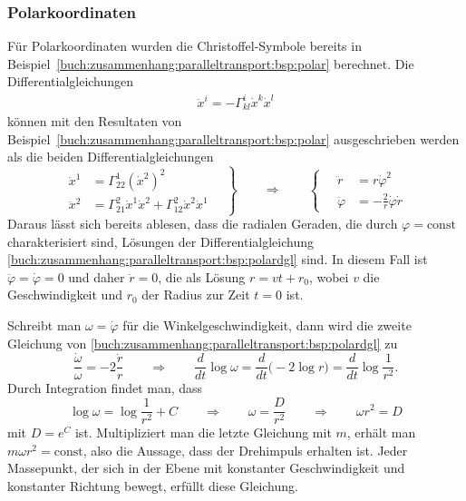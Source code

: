 \subsubsection{Polarkoordinaten}
Für Polarkoordinaten wurden die Christoffel-Symbole bereits
in Beispiel~\ref{buch:zusammenhang:paralleltransport:bsp:polar}
berechnet.
Die Differentialgleichungen
\begin{align*}
\ddot{x}^i=-\Gamma^i_{kl}\dot{x}^k\dot{x}^l
\end{align*}
können mit den Resultaten von 
Beispiel~\ref{buch:zusammenhang:paralleltransport:bsp:polar}
ausgeschrieben werden als die beiden Differentialgleichungen
\begin{equation}
\left.
\begin{aligned}
\ddot{x}^1
&=
\Gamma^1_{22}(\dot{x}^2)^2
\\
\ddot{x}^2
&=
\Gamma^2_{21}\dot{x}^1\dot{x}^2
+
\Gamma^2_{12}\dot{x}^2\dot{x}^1
\end{aligned}
\quad
\right\}
\qquad
\Rightarrow
\qquad
\left\{
\quad
\begin{aligned}
\ddot{r}
&=
r \dot{\varphi}^2
\\
\ddot{\varphi}
&=
-\frac{2}{r}\dot{\varphi}\dot{r}
\end{aligned}
\right.
\label{buch:zusammenhang:paralleltransport:bsp:polardgl}
\end{equation}
Daraus lässt sich bereits ablesen, dass die radialen Geraden, die
durch $\varphi=\text{const}$ charakterisiert sind, Lösungen
der Differentialgleichung
\eqref{buch:zusammenhang:paralleltransport:bsp:polardgl}
sind.
In diesem Fall ist $\ddot{\varphi}=\dot{\varphi}=0$ und
daher $\ddot{r}=0$, die als Lösung $r=vt+r_0$, wobei $v$ die Geschwindigkeit
und $r_0$ der Radius zur Zeit $t=0$ ist.

Schreibt man $\omega=\dot{\varphi}$ für die Winkelgeschwindigkeit, dann
wird die zweite Gleichung von
\eqref{buch:zusammenhang:paralleltransport:bsp:polardgl}
zu
\[
\frac{\dot{\omega}}{\omega}
=
-2\frac{\dot{r}}{r}
\qquad\Rightarrow\qquad
\frac{d}{dt}\log \omega
=
\frac{d}{dt}\bigl(-2\log r\bigr)
=
\frac{d}{dt}\log\frac{1}{r^2}.
\]
Durch Integration findet man, dass
\begin{equation}
\log \omega = \log\frac{1}{r^2} + C
\qquad\Rightarrow\qquad
\omega = \frac{D}{r^2}
\qquad\Rightarrow\qquad
\omega r^2 = D
\label{buch:zusammenhang:paralleltransport:bsp:drehimpuls}
\end{equation}
mit $D=e^C$ ist.
Multipliziert man die letzte Gleichung mit $m$, erhält man
$m\omega r^2=\text{const}$, also die Aussage, dass der Drehimpuls
erhalten ist.
Jeder Massepunkt, der sich in der Ebene mit konstanter Geschwindigkeit
und konstanter Richtung bewegt, erfüllt diese Gleichung.

